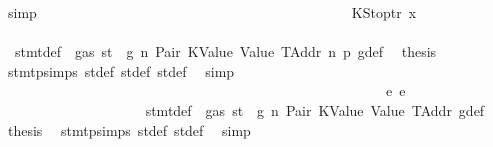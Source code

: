 \begin{isabellebody}
\ simp\isanewline
\ \ \ \ \ \ \ \ \ \ \ \ \ \ \ \ \ \ \ \ \isamarkupfalse%
\isanewline
\ \ \ \ \ \ \ \ \ \ \ \ \ \ \ \ \ \ \ \ \ \ \isamarkupfalse%
\ {\isacharparenleft}{\kern0pt}KStoptr\ x{}{\isacharparenright}{\kern0pt}\isanewline
\ \ \ \ \ \ \ \ \ \ \ \ \ \ \ \ \ \ \ \ \ \ \isamarkupfalse%
\ {}{\isacharparenleft}{\kern0pt}{}{\isacharparenright}{\kern0pt}\ stmt{\isacharunderscore}{\kern0pt}def\ {\isacharbackquoteopen}{\isasymnot}\ gas\ st\ {\isasymle}\ g{\isacharbackquoteclose}\ n\ Pair\ KValue\ Value\ TAddr\ n{}\ p{}\ g{\isacharunderscore}{\kern0pt}def\ \isamarkupfalse%
\ {\isacharquery}{\kern0pt}thesis\ \isamarkupfalse%
\ stmt{\isachardot}{\kern0pt}psimps{\isacharparenleft}{\kern0pt}{}{\isacharparenright}{\kern0pt}\ st{\isacharprime}{\kern0pt}{\isacharunderscore}{\kern0pt}def\ st{\isacharprime}{\kern0pt}{\isacharprime}{\kern0pt}{\isacharunderscore}{\kern0pt}def\ st{\isacharprime}{\kern0pt}{\isacharprime}{\kern0pt}{\isacharprime}{\kern0pt}{\isacharunderscore}{\kern0pt}def\ \isamarkupfalse%
\ simp\isanewline
\ \ \ \ \ \ \ \ \ \ \ \ \ \ \ \ \ \ \ \ \isamarkupfalse%
\isanewline
\ \ \ \ \ \ \ \ \ \ \ \ \ \ \ \ \ \ \isamarkupfalse%
\isanewline
\ \ \ \ \ \ \ \ \ \ \ \ \ \ \ \ \isamarkupfalse%
\isanewline
\ \ \ \ \ \ \ \ \ \ \ \ \ \ \ \ \ \ \isamarkupfalse%
\ {\isacharparenleft}{\kern0pt}e\ e{\isacharparenright}{\kern0pt}\isanewline
\ \ \ \ \ \ \ \ \ \ \ \ \ \ \ \ \ \ \isamarkupfalse%
\ {}{\isacharparenleft}{\kern0pt}{}{\isacharparenright}{\kern0pt}\ stmt{\isacharunderscore}{\kern0pt}def\ {\isacharbackquoteopen}{\isasymnot}\ gas\ st\ {\isasymle}\ g{\isacharbackquoteclose}\ n\ Pair\ KValue\ Value\ TAddr\ g{\isacharunderscore}{\kern0pt}def\ \isamarkupfalse%
\ {\isacharquery}{\kern0pt}thesis\ \isamarkupfalse%
\ stmt{\isachardot}{\kern0pt}psimps{\isacharparenleft}{\kern0pt}{}{\isacharparenright}{\kern0pt}\ st{\isacharprime}{\kern0pt}{\isacharunderscore}{\kern0pt}def\ st{\isacharprime}{\kern0pt}{\isacharprime}{\kern0pt}{\isacharunderscore}{\kern0pt}def\ \isamarkupfalse%
\ simp\isanewline
\ \ \ \ \ \ \ \ \ \ \ \ \ \ \ \ \isamarkupfalse%
\isanewline
\ \ \ \ \ \ \ \ \ \ \ \ \ \ \isamarkupfalse%
\isanewline
\ \ \ \ \ \ \ \ \ \ \ \ \isamarkupfalse%
\isanewline
\ \ \ \ \ \ \ \ \ \ \ \ \ \ \isamarkupfalse%

\end{isabellebody}
